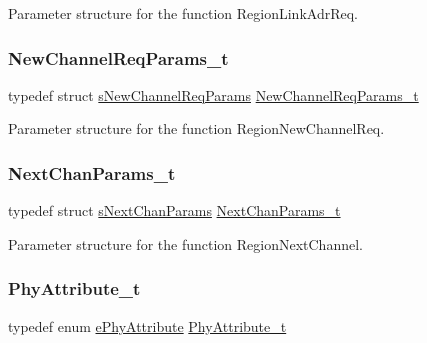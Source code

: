 Parameter structure for the function Region\+Link\+Adr\+Req. \mbox{\label{group___r_e_g_i_o_n_gae2abcdb6dbb843c9faf5fd3009eca9d6}} 
\subsubsection{\texorpdfstring{New\+Channel\+Req\+Params\+\_\+t}{NewChannelReqParams\_t}}
{\footnotesize\ttfamily typedef struct \mbox{\hyperlink{structs_new_channel_req_params}{s\+New\+Channel\+Req\+Params}} \mbox{\hyperlink{group___r_e_g_i_o_n_gae2abcdb6dbb843c9faf5fd3009eca9d6}{New\+Channel\+Req\+Params\+\_\+t}}}

Parameter structure for the function Region\+New\+Channel\+Req. \mbox{\label{group___r_e_g_i_o_n_ga115f5e83afae352c0a3dcdc193374040}} 
\subsubsection{\texorpdfstring{Next\+Chan\+Params\+\_\+t}{NextChanParams\_t}}
{\footnotesize\ttfamily typedef struct \mbox{\hyperlink{structs_next_chan_params}{s\+Next\+Chan\+Params}} \mbox{\hyperlink{group___r_e_g_i_o_n_ga115f5e83afae352c0a3dcdc193374040}{Next\+Chan\+Params\+\_\+t}}}

Parameter structure for the function Region\+Next\+Channel. \mbox{\label{group___r_e_g_i_o_n_ga9445b07fdf77581ecfaf389970e635f8}} 
\subsubsection{\texorpdfstring{Phy\+Attribute\+\_\+t}{PhyAttribute\_t}}
{\footnotesize\ttfamily typedef enum \mbox{\hyperlink{group___r_e_g_i_o_n_ga51cbe8f5433d914fe9cf81b451de2c2d}{e\+Phy\+Attribute}} \mbox{\hyperlink{group___r_e_g_i_o_n_ga9445b07fdf77581ecfaf389970e635f8}{Phy\+Attribute\+\_\+t}}}

